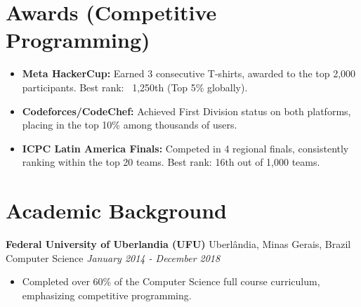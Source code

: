 \documentclass[a4paper,10pt]{article}
\begin{document}
\section*{Awards (Competitive Programming)}
\begin{itemize}
    \item \textbf{Meta HackerCup:} Earned 3 consecutive T-shirts, awarded to the top 2,000 participants. Best rank: ~1,250th (Top 5\% globally).
    \item \textbf{Codeforces/CodeChef:} Achieved First Division status on both platforms, placing in the top 10\% among thousands of users.
    \item \textbf{ICPC Latin America Finals:} Competed in 4 regional finals, consistently ranking within the top 20 teams. Best rank: 16th out of 1,000 teams.
\end{itemize}

\section*{Academic Background}

\textbf{Federal University of Uberlandia (UFU)} \hfill Uberlândia, Minas Gerais, Brazil \\
Computer Science \hfill \textit{January 2014 - December 2018}
\begin{itemize}
    \item Completed over 60\% of the Computer Science full course curriculum, emphasizing competitive programming.
\end{itemize}
\end{document}
